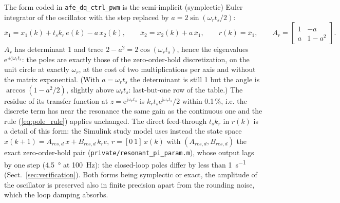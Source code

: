 \documentclass[10pt,a4paper]{scrartcl}
\newcommand{\ts}{t_s}
\newcommand{\wres}{\omega_r}
\newcommand{\jj}{\mathrm{j}}
\newcommand{\ee}{\mathrm{e}}
\newcommand{\code}[1]{\texttt{#1}}
\begin{document}
\begin{onehalfspace}
The form coded in \code{afe\_dq\_ctrl\_pwm} is the semi-implicit (symplectic) Euler integrator of the oscillator with the step replaced by $a = 2\sin(\wres\ts/2)$:
\begin{equation}
\bar x_1 = x_1(k) + \ts k_r\,e(k) - a\,x_2(k), \qquad \bar x_2 = x_2(k) + a\,\bar x_1, \qquad r(k) = \bar x_1,
\qquad A_r = \begin{bmatrix} 1 & -a \\ a & 1 - a^2 \end{bmatrix}.
\label{eq:res_code}
\end{equation}
$A_r$ has determinant 1 and trace $2 - a^2 = 2\cos(\wres\ts)$, hence the eigenvalues $\ee^{\pm\jj\wres\ts}$: the poles are exactly those of the zero-order-hold discretization, on the unit circle at exactly $\wres$, at the cost of two multiplications per axis and without the matrix exponential. (With $a = \wres\ts$ the determinant is still 1 but the angle is $\arccos(1 - a^2/2)$, slightly above $\wres\ts$: last-but-one row of the table.) The residue of its transfer function at $z = \ee^{\jj\wres\ts}$ is $k_r\ts\ee^{\jj\wres\ts}/2$ within 0.1\,\%, i.e. the discrete term has near the resonance the same gain as the continuous one and the rule (\ref{eq:pole_rule}) applies unchanged. The direct feed-through $\ts k_r$ in $r(k)$ is a detail of this form: the Simulink study model uses instead the state space $x(k+1) = A_{res,d}\,x + B_{res,d}\,k_r e$, $r = [0\ 1]\,x(k)$ with $(A_{res,d}, B_{res,d})$ the exact zero-order-hold pair (\code{private/resonant\_pi\_param.m}), whose output lags by one step (\SI{4.5}{\degree} at \SI{100}{Hz}): the closed-loop poles differ by less than \SI{1}{s^{-1}} (Sect.~\ref{sec:verification}). Both forms being symplectic or exact, the amplitude of the oscillator is preserved also in finite precision apart from the rounding noise, which the loop damping absorbs.


\end{onehalfspace}
\end{document}

